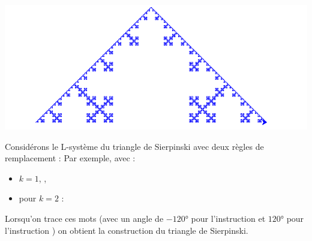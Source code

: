 \documentclass[11pt,class=report,crop=false]{standalone}
\begin{document}
\begin{exemple}
\begin{center}
\includegraphics[scale=\myscale,scale=0.22]{figures/ecran-lsysteme-3e}
\end{center}
\end{exemple}

\begin{exemple}
Considérons le L-système du triangle de Sierpinski avec deux règles de remplacement :
Par exemple, avec :
  \begin{itemize} 
    \item $k = 1$, ,
    \item pour $k = 2$ :    
  \end{itemize}  

Lorsqu'on trace ces mots (avec un angle de $\ang{-120}$ pour l'instruction \mot{+} et $\ang{120}$ pour l'instruction \mot{-}) on obtient la construction du triangle de Sierpinski. 
  

\end{exemple}
\end{document}
